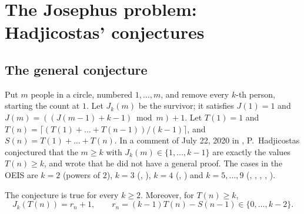 

\section{The Josephus problem: Hadjicostas' conjectures}\label{s:A005427}
\subsection{The general conjecture}
Put $m$ people in a circle, numbered $1,\dots,m$, and remove every $k$-th person, starting the count at $1$.
Let $J_k(m)$ be the survivor; it satisfies $J(1)=1$ and $J(m)=((J(m-1)+k-1)\bmod m)+1$. Let $T(1)=1$ and
$T(n)=\lceil(T(1)+\dots+T(n-1))/(k-1)\rceil$, and $S(n)=T(1)+\dots+T(n)$. In a comment of July 22, 2020 in
, P.~Hadjicostas conjectured that the $m\ge k$ with $J_k(m)\in\{1,\dots,k-1\}$ are exactly the
values $T(n)\ge k$, and wrote that he did not have a general proof. The cases in the OEIS are $k=2$ (powers
of $2$), $k=3$ (, ), $k=4$ (, ) and $k=5,\dots,9$
(, , , , ).

\begin{theorem}\label{t:josephus} The conjecture is true for every $k\ge2$. Moreover, for $T(n)\ge k$,
\[ J_k(T(n))=r_n+1,\qquad r_n=(k-1)T(n)-S(n-1)\in\{0,\dots,k-2\}. \]\end{theorem}

